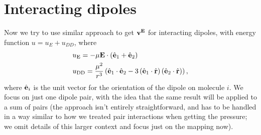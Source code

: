 \documentclass[11pt,reqno]{amsart}
\begin{document}
\section{Interacting dipoles}
Now we try to use similar approach to get ${\bf v}^{\bf E}$ for interacting dipoles, with energy function $u=u_E+u_{DD}$, where
\begin{subequations}
\label{eq:dipoleDipole}
\begin{align}
&u_{\rm E}=-\mu {\bf E}\cdot \left({\hat {\bf e}}_{1}+ {\hat {\bf e}}_2 \right) \\ 
&u_{\rm DD}=\frac{\mu ^2}{r^3}\left({\hat {\bf e}}_{1}\cdot{\hat {\bf e}}_{2}-3\left({\hat {\bf e}}_{1}\cdot\hat{\bf r}\right)\left({\hat {\bf e}}_{2}\cdot\hat{\bf r}\right)\right),
\end{align}
\end{subequations}
where $\hat {\bf e}_{i}$ is the unit vector for the orientation of the dipole on molecule $i$. We focus on just one dipole pair, with the idea that the same result will be applied to a sum of pairs (the approach isn't entirely straightforward, and has to be handled in a way similar to how we treated pair interactions when getting the pressure; we omit details of this larger context and focus just on the mapping now).
\end{document}
